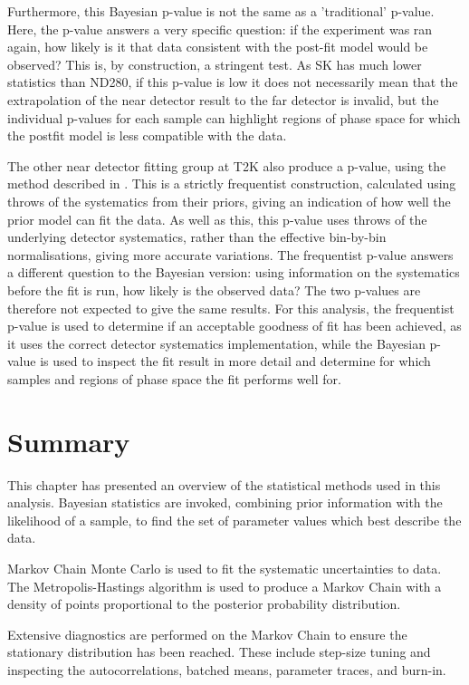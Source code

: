 Furthermore, this Bayesian p-value is not the same as a 'traditional' p-value. Here, the p-value answers a very specific question: if the experiment was ran again, how likely is it that data consistent with the post-fit model would be observed? This is, by construction, a stringent test. As SK has much lower statistics than ND280, if this p-value is low it does not necessarily mean that the extrapolation of the near detector result to the far detector is invalid, but the individual p-values for each sample can highlight regions of phase space for which the postfit model is less compatible with the data.

The other near detector fitting group at T2K also produce a p-value, using the method described in \cite{tn324}. This is a strictly frequentist construction, calculated using throws of the systematics from their priors, giving an indication of how well the prior model can fit the data. As well as this, this p-value uses throws of the underlying detector systematics, rather than the effective bin-by-bin normalisations, giving more accurate variations. The frequentist p-value answers a different question to the Bayesian version: using information on the systematics before the fit is run, how likely is the observed data? The two p-values are therefore not expected to give the same results. For this analysis, the frequentist p-value is used to determine if an acceptable goodness of fit has been achieved, as it uses the correct detector systematics implementation, while the Bayesian p-value is used to inspect the fit result in more detail and determine for which samples and regions of phase space the fit performs well for.

\section{Summary}

This chapter has presented an overview of the statistical methods used in this analysis. Bayesian statistics are invoked, combining prior information with the likelihood of a sample, to find the set of parameter values which best describe the data.

Markov Chain Monte Carlo is used to fit the systematic uncertainties to data. The Metropolis-Hastings algorithm is used to produce a Markov Chain with a density of points proportional to the posterior probability distribution.

Extensive diagnostics are performed on the Markov Chain to ensure the stationary distribution has been reached. These include step-size tuning and inspecting the autocorrelations, batched means, parameter traces, and burn-in.


